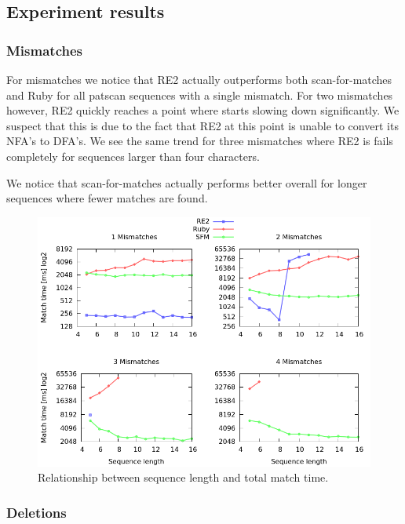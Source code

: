 \documentclass[12pt]{article}
\theoremstyle{definition}
\begin{document}
\newpage

\subsection{Experiment results}

\subsubsection{Mismatches}

For mismatches we notice that RE2 actually outperforms both scan-for-matches and Ruby for all patscan sequences with a single mismatch. For two mismatches however, RE2 quickly reaches a point where starts slowing down significantly. We suspect that this is due to the fact that RE2 at this point is unable to convert its NFA's to DFA's. We see the same trend for three mismatches where RE2 is fails completely for sequences larger than four characters.

We notice that scan-for-matches actually performs better overall for longer sequences where fewer matches are found.

\begin{figure}[H]
	\begin{center}
		\includegraphics[scale=0.55]{graphs/mismatches.png}	
	\end{center}
	\caption{Relationship between sequence length and total match time.}
	\label{graph:cases:mismatches}
\end{figure}

\subsubsection{Deletions}
\end{document}
